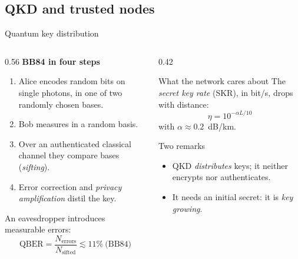 \documentclass[10pt]{beamer}
\begin{document}
\subsection{QKD and trusted nodes}

\begin{frame}{Quantum key distribution}
  \begin{columns}[T]
    \begin{column}{0.56\textwidth}
      \textbf{BB84 in four steps}
      \begin{enumerate}
        \item Alice encodes random bits on single photons, in one of two
              randomly chosen bases.
        \item Bob measures in a random basis.
        \item Over an \alert{authenticated} classical channel they compare
              bases (\emph{sifting}).
        \item Error correction and \emph{privacy amplification} distil the
              key.
      \end{enumerate}
      \vspace{1ex}
      An eavesdropper introduces measurable errors:
      \[
        \mathrm{QBER} = \frac{N_{\text{errors}}}{N_{\text{sifted}}}
        \lesssim 11\% \ \text{(BB84)}
      \]
    \end{column}
    \begin{column}{0.42\textwidth}
      \begin{block}{What the network cares about}
        The \emph{secret key rate} (SKR), in bit/s, drops with distance:
        \[
          \eta = 10^{-\alpha L/10}
        \]
        with \(\alpha \approx 0.2\)~dB/km.
      \end{block}
      \begin{alertblock}{Two remarks}
        \begin{itemize}
          \item QKD \emph{distributes} keys; it neither encrypts nor
                authenticates.
          \item It needs an initial secret: it is \emph{key growing}.
        \end{itemize}
      \end{alertblock}
    \end{column}
  \end{columns}
\end{frame}
\end{document}
